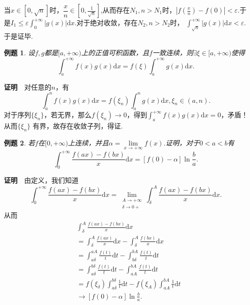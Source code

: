 \documentclass[UTF8]{article}
\newcommand{\dx}{\mathrm{d}x}
\newcommand{\zm}{\textbf{证明}$\quad$}
\newtheorem{exa}{\hspace{2em}例题}[section]
\begin{document}
当$x\in[0,\sqrt{n}]$时，$\dfrac{x}{n}\in[0,\frac{1}{\sqrt{n}}]$,从而存在$N_1,n>N_1$时，$|f(\frac{x}{n})-f(0)|<
\varepsilon$.于是$I_1\le\varepsilon\int_0^{+\infty}|g(x)|\dx.$对于绝对收敛，存在$N_2,n>N_2$时，
$\int_{\sqrt{n}}^{+\infty}|g(x)|\dx<\varepsilon$.于是证毕.
\begin{exa}
  设$f,g$都是$[a,+\infty)$上的正值可积函数，且$f$一致连续，则$\exists\xi\in[a,+\infty)$使得
  $$\int_a^{+\infty}f(x)g(x)\dx=f(\xi)\int_a^{+\infty}g(x)\dx.$$
\end{exa}
\zm 对任意的$n$，有
$$\int_a^nf(x)g(x)\dx=f(\xi_n)\int_a^ng(x)\dx,\xi_n\in(a,n).$$
对于序列$\{\xi_n\}$，若无界，那么$f(\xi_n)\to0$，得到$\int_a^{+\infty}f(x)g(x)\dx=0$，矛盾！从而$\{\xi_n\}$
有界，故存在收敛子列，得证.
\begin{exa}
  若$f$在$[0,+\infty)$上连续，并且$\alpha=\lim\limits_{x\to+\infty}f(x)$.证明，对于$0<a<b$有
  $$\int_0^{+\infty}\frac{f(ax)-f(bx)}{x}\dx=[f(0)-\alpha]\ln\frac{b}{a}.$$
\end{exa}
\zm 由定义，我们知道
$$\int_0^{+\infty}\frac{f(ax)-f(bx)}{x}\dx=\lim_{\substack{A\to+\infty\\\delta\to0+}}
\int_{\delta}^A\frac{f(ax)-f(bx)}{x}\dx.$$
从而
\begin{align*}
  &\int_{\delta}^A\frac{f(ax)-f(bx)}{x}\dx\\
  &=\int_{\delta}^A\frac{f(ax)}{x}\dx-\int_{\delta}^A\frac{f(bx)}{x}\dx\\
  &=\int_{a\delta}^{aA}\frac{f(t)}{t}\mathrm{d}t-\int_{b\delta}^{bA}\frac{f(t)}{t}\mathrm{d}t\\
  &=\int_{a\delta}^{b\delta}\frac{f(t)}{t}\mathrm{d}t-\int_{aA}^{bA}\frac{f(t)}{t}\mathrm{d}t\\
  &=f(\xi_\delta)\int_{a\delta}^{b\delta}\frac{1}{t}\mathrm{d}t-
  f(\xi_A)\int_{aA}^{bA}\frac{1}{t}\mathrm{d}t\\
  &\to [f(0)-\alpha]\ln\frac{b}{a}.
\end{align*}
\clearpage
\end{document}
